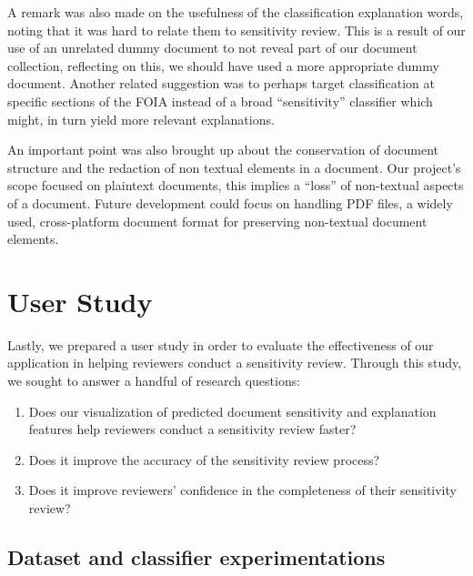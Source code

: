 \documentclass[\version]{l4proj}
\begin{document}
A remark was also made on the usefulness of the classification explanation words, noting that it was hard to relate them to sensitivity review.
This is a result of our use of an unrelated dummy document to not reveal part of our document collection, reflecting on this, we should have used a more appropriate dummy document.
Another related suggestion was to perhaps target classification at specific sections of the FOIA instead of a broad ``sensitivity'' classifier which might, in turn yield more relevant explanations.

An important point was also brought up about the conservation of document structure and the redaction of non textual elements in a document.
Our project's scope focused on plaintext documents, this implies a ``loss'' of non-textual aspects of a document.
Future development could focus on handling PDF files, a widely used, cross-platform document format for preserving non-textual document elements.




\section{User Study}

Lastly, we prepared a user study in order to evaluate the effectiveness of our application in helping reviewers conduct a sensitivity review.
Through this study, we sought to answer a handful of research questions:

\begin{enumerate}[label=\textbf{RQ\arabic*}]
    \item Does our visualization of predicted document sensitivity and explanation features help reviewers conduct a sensitivity review faster?
    \item Does it improve the accuracy of the sensitivity review process?
    \item Does it improve reviewers' confidence in the completeness of their sensitivity review?
\end{enumerate}

\subsection{Dataset and classifier experimentations}
\end{document}
